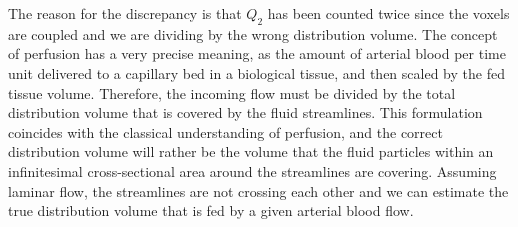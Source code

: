 \documentclass[paper=a4, fontsize=11pt,parskip=half,headings=small]{scrartcl}
\newcommand{\Perf}{Q}
\begin{document}
	The reason for the discrepancy is that $\Perf_{2}$ has been counted twice since the voxels are coupled and we are dividing by the wrong distribution volume. 
	The concept of perfusion has a very precise meaning, as the amount of arterial blood per time unit delivered to a capillary bed in a biological tissue, and then scaled by the fed tissue volume. 
	Therefore, the incoming flow must be divided by the total distribution volume that is covered by the fluid streamlines. 
	This formulation coincides with the classical understanding of perfusion, and the correct distribution volume will rather be the volume that the fluid particles within an infinitesimal cross-sectional area around the streamlines are covering. 
	Assuming laminar flow, the streamlines are not crossing each other and we can estimate the true distribution volume that is fed by a given arterial blood flow.
\end{document}
